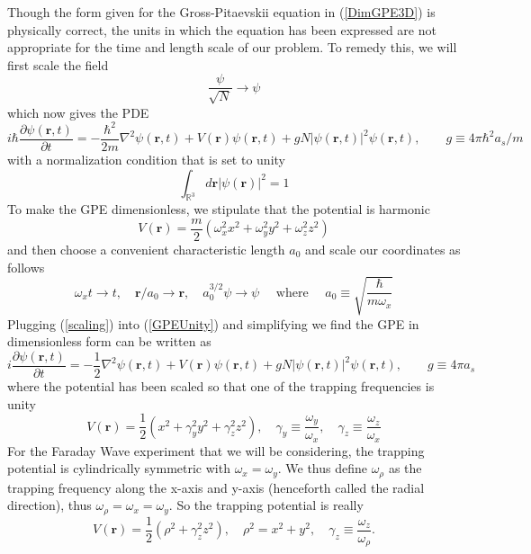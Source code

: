 \documentclass[12]{article}
\begin{document}
Though the form given for the Gross-Pitaevskii equation in (\ref{DimGPE3D}) is physically correct, the units in which the equation has been expressed are not appropriate for the time and length scale of our problem. To remedy this, we will first scale the field
\begin{equation}
\frac{\psi}{\sqrt{N}} \rightarrow \psi
\end{equation}
which now gives the PDE
\begin{equation}
i \hbar \frac{\partial \psi(\mathbf{r}, t)}{\partial t}=-\frac{\hbar^{2}}{2 m} \nabla^{2} \psi(\mathbf{r}, t)+V(\mathbf{r}) \psi(\mathbf{r}, t)+ gN|\psi(\mathbf{r}, t)|^{2} \psi(\mathbf{r}, t), \quad \quad g \equiv 4 \pi \hbar^{2} a_{s} / m
\label{GPEUnity}
\end{equation}
with a normalization condition that is set to unity
\begin{equation}
\int_{\mathbb{R}^{3}} d \mathbf{r}|\psi(\mathbf{r})|^{2} = 1
\end{equation}
To make the GPE dimensionless, we stipulate that the potential is harmonic
\begin{equation}
V(\textbf{r}) = \frac{m}{2}\left(\omega_{x}^{2} x^{2}+\omega_{y}^{2} y^{2}+\omega_{z}^{2} z^{2}\right)
\end{equation}
and then choose a convenient characteristic length $a_0$ and scale our coordinates as follows
\begin{equation}
\omega_{x} t \rightarrow t, \quad \mathbf{r} / a_{0} \rightarrow \mathbf{r}, \quad a_{0}^{3 / 2} \psi \rightarrow \psi \quad \text { where } \quad a_{0} \equiv \sqrt{\frac{\hbar }{ m \omega_{x}}}
\label{scaling}
\end{equation}
Plugging (\ref{scaling}) into (\ref{GPEUnity}) and simplifying we find the GPE in dimensionless form can be written as
\begin{equation}
i \frac{\partial \psi(\mathbf{r}, t)}{\partial t}= -\frac{1}{2 } \nabla^{2} \psi(\mathbf{r}, t)+V(\mathbf{r}) \psi(\mathbf{r}, t)+ gN|\psi(\mathbf{r}, t)|^{2} \psi(\mathbf{r}, t), \quad \quad g \equiv 4 \pi a_{s}
\label{GPE3D}
\end{equation}
where the potential has been scaled so that one of the trapping frequencies is unity
\begin{equation*}
V(\textbf{r}) = \frac{1}{2}\left( x^{2}+\gamma_{y}^{2} y^{2}+\gamma_{z}^{2} z^{2}\right), \quad \gamma_y \equiv \frac{\omega_y}{\omega_x}, \quad \gamma_z \equiv \frac{\omega_z}{\omega_x}
\end{equation*}
For the Faraday Wave experiment that we will be considering, the trapping potential is cylindrically symmetric with $\omega_x = \omega_y$. We thus define $\omega_\rho$ as the trapping frequency along the x-axis and y-axis (henceforth called the radial direction), thus $\omega_\rho = \omega_x = \omega_y$. So the trapping potential is really
\begin{equation}
V(\textbf{r}) = \frac{1}{2}\left( \rho^{2}+\gamma_{z}^{2} z^{2}\right), \quad \rho^2 = x^2 + y^2, \quad \gamma_z \equiv \frac{\omega_z}{\omega_\rho}.
\end{equation}
\end{document}

